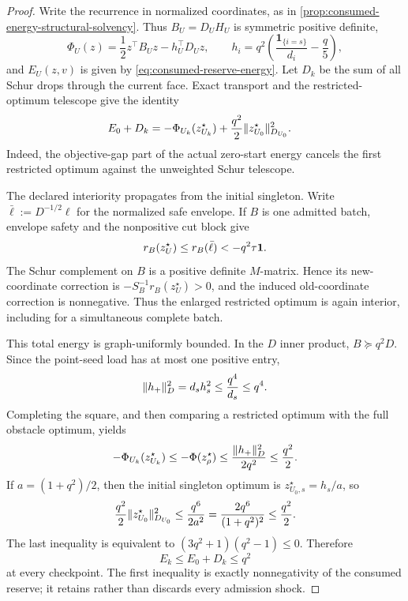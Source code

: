 \begin{proof}
Write the recurrence in normalized coordinates, as in
\cref{prop:consumed-energy-structural-solvency}.  Thus
$B_U=D_UH_U$ is symmetric positive definite,
\begin{equation*}
 \Phi_U(z)=\frac12z^\top B_Uz-h_U^\top D_Uz,
 \qquad
 h_i=q^2\left(\frac{\mathbf1_{\{i=s\}}}{d_i}-\frac q5\right),
\end{equation*}
and $E_U(z,v)$ is given by \cref{eq:consumed-reserve-energy}.  Let $D_k$ be
the sum of all Schur drops through the current face.  Exact transport and the
restricted-optimum telescope give the identity
\begin{align}
 E_0+D_k
 &= -\Phi_{U_k}(z_{U_k}^\star)
    +\frac{q^2}{2}\lVert z_{U_0}^\star\rVert_{D_{U_0}}^2.
 \label{eq:complete-gate-total-energy-identity}
\end{align}
Indeed, the objective-gap part of the actual zero-start energy cancels the
first restricted optimum against the unweighted Schur telescope.

The declared interiority propagates from the initial singleton.  Write
$\bar\ell:=D^{-1/2}\ell$ for the normalized safe envelope.  If $B$ is one
admitted batch, envelope safety and the nonpositive cut block give
\begin{equation*}
 r_B(z_U^\star)\leq r_B(\bar\ell)<-q^2\tau\mathbf{1}.
\end{equation*}
The Schur complement on $B$ is a positive definite $M$-matrix.  Hence its
new-coordinate correction is $-S_B^{-1}r_B(z_U^\star)>0$, and the induced
old-coordinate correction is nonnegative.  Thus the enlarged restricted
optimum is again interior, including for a simultaneous complete batch.

This total energy is graph-uniformly bounded.  In the $D$ inner product,
$B\succeq q^2D$.  Since the point-seed load has at most one positive entry,
\begin{equation*}
 \lVert h_+\rVert_D^2
 =d_sh_s^2
 \leq\frac{q^4}{d_s}\leq q^4.
\end{equation*}
Completing the square, and then comparing a restricted optimum with the full
obstacle optimum, yields
\begin{equation*}
 -\Phi_{U_k}(z_{U_k}^\star)
 \leq-\Phi(z_\rho^\star)
 \leq\frac{\lVert h_+\rVert_D^2}{2q^2}
 \leq\frac{q^2}{2}.
\end{equation*}
If $a=(1+q^2)/2$, then the initial singleton optimum is
$z_{U_0,s}^\star=h_s/a$, so
\begin{equation*}
 \frac{q^2}{2}\lVert z_{U_0}^\star\rVert_{D_{U_0}}^2
 \leq\frac{q^6}{2a^2}
 =\frac{2q^6}{(1+q^2)^2}
 \leq\frac{q^2}{2}.
\end{equation*}
The last inequality is equivalent to
$(3q^2+1)(q^2-1)\leq0$.  Therefore
\begin{equation}
 E_k\leq E_0+D_k\leq q^2
 \label{eq:complete-gate-graph-uniform-energy-cap}
\end{equation}
at every checkpoint.  The first inequality is exactly nonnegativity of the
consumed reserve; it retains rather than discards every admission shock.


\end{proof}
